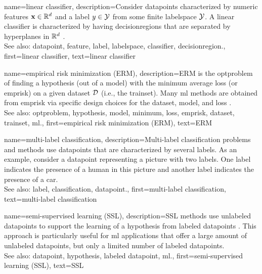 {name={linear classifier}, 
	description={Consider \glspl{datapoint} characterized by numeric \glspl{feature} ${\bf x} \in \mathbb{R}^{d}$ 
	    	and a \gls{label} $y \in \mathcal{Y}$ from some finite \gls{labelspace} $\mathcal{Y}$. 
		A linear \gls{classifier} is characterized by having \glspl{decisionregion} that are 
		separated by hyperplanes in $\mathbb{R}^{d}$ \cite[Ch. 2]{MLBasics}.
				\\
		See also: \gls{datapoint}, \gls{feature}, \gls{label}, \gls{labelspace}, \gls{classifier}, \gls{decisionregion}.},
	first={linear classifier},
	text={linear classifier} 
}


{name={empirical risk minimization (ERM)}, 
	description={ERM is the \gls{optproblem} of finding 
		a \gls{hypothesis} (out of a \gls{model}) with the \gls{minimum} average \gls{loss} (or \gls{emprisk}) on a given \gls{dataset} 
		$\mathcal{D}$ (i.e., the \gls{trainset}). Many \gls{ml} methods are obtained from 
		\gls{emprisk} via specific design choices for the \gls{dataset}, \gls{model}, and \gls{loss} \cite[Ch. 3]{MLBasics}.
				\\
		See also: \gls{optproblem}, \gls{hypothesis}, \gls{model}, \gls{minimum}, \gls{loss}, \gls{emprisk}, \gls{dataset}, \gls{trainset}, \gls{ml}.},
	first={empirical risk minimization (ERM)},
	text={ERM} 
}


{name={multi-label classification}, 
	description={Multi-\gls{label} 
		\gls{classification} problems and methods use \glspl{datapoint} 
		that are characterized by several \glspl{label}. As an example, consider a \gls{datapoint} 
		representing a picture with two \glspl{label}. One \gls{label} indicates the presence of a human 
		in this picture and another \gls{label} indicates the presence of a car.
				\\
		See also: \gls{label}, \gls{classification}, \gls{datapoint}.},
	    first={multi-label classification},
	    text={multi-label classification} 
}


{name={semi-supervised learning (SSL)}, 
	description={SSL methods use unlabeled \glspl{datapoint}
		to support the learning of a \gls{hypothesis} from \glspl{labeled datapoint} \cite{SemiSupervisedBook}. 
		This approach is particularly useful for \gls{ml} applications that offer a large amount of 
		unlabeled \glspl{datapoint}, but only a limited number of \glspl{labeled datapoint}.
			\\
		See also: \gls{datapoint}, \gls{hypothesis}, \gls{labeled datapoint}, \gls{ml}.}, 
	first={semi-supervised learning (SSL)},
	text={SSL} 
}
	
